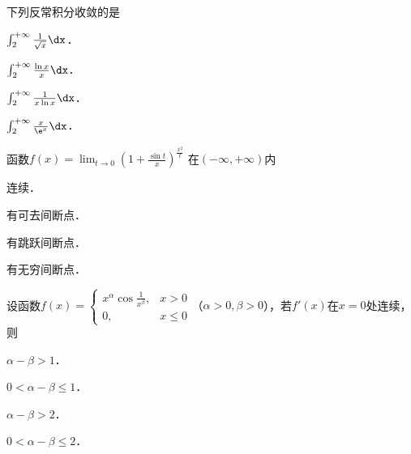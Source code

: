 \documentclass[plain,noanswer,medmath]{../../template/jnuexam}
\begin{document}






\begin{problem}
下列反常积分收敛的是\pickout{}
\begin{abcd}
\item $\int_2^{+\infty} \frac{1}{\sqrt{x}}\dx$．
\item $\int_2^{+\infty} \frac{\ln x}{x}\dx$．
\item $\int_2^{+\infty} \frac{1}{x\ln x}\dx$．
\item $\int_2^{+\infty} \frac{x}{\e^x}\dx$．
\end{abcd}
\end{problem}


\begin{problem}
函数$f(x) = \lim_{t \to 0} \left(1 + \frac{\sin t}{x} \right)^{\frac{x^2}{t}}$
在$(-\infty , +\infty)$内\pickout{}
\begin{abcd}
\item 连续．
\item 有可去间断点．
\item 有跳跃间断点．
\item 有无穷间断点．
\end{abcd}
\end{problem}


\begin{problem}
设函数$f(x) = \begin{cases}
  x^{\alpha}\cos \frac{1}{x^{\beta}}, & x > 0 \\
                                   0, & x \le 0
\end{cases}$（$\alpha > 0,\beta > 0$），若$f'(x)$在$x = 0$处连续，则\pickout{}
\begin{abcd}
\item $\alpha - \beta > 1$．
\item $0 < \alpha - \beta \le 1$．
\item $\alpha - \beta > 2$．
\item $0 < \alpha - \beta \le 2$．
\end{abcd}
\end{problem}


\end{document}
